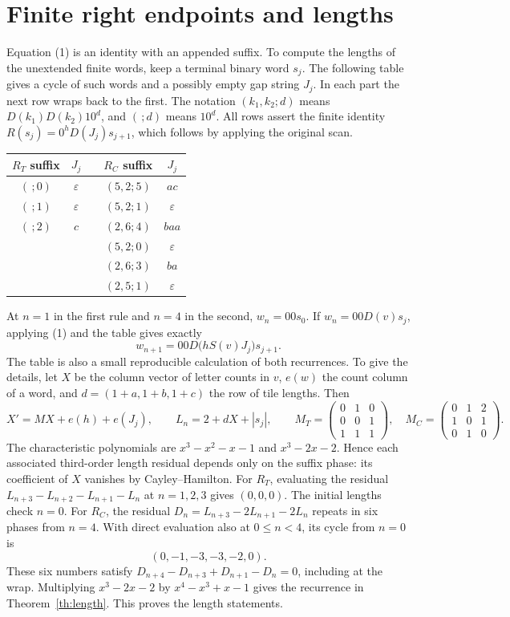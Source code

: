 \documentclass[10pt]{article}
\newcommand{\eps}{\varepsilon}
\begin{document}
\section{Finite right endpoints and lengths}
Equation (1) is an identity with an appended suffix. To compute the lengths of the
unextended finite words, keep a terminal binary word $s_j$. The following table gives a
cycle of such words and a possibly empty gap string $J_j$. In each part the next row
wraps back to the first. The notation $(k_1,k_2;d)$ means $D(k_1)D(k_2)10^d$,
and $(\,;d)$ means $10^d$. All rows assert the finite identity
$R(s_j)=0^h D(J_j)s_{j+1}$, which follows by applying the original scan.
\begin{center}
\begin{tabular}{ccccc}
\toprule
$R_T$ suffix & $J_j$ & \hspace{.35in} & $R_C$ suffix & $J_j$\\
\midrule
$(\,;0)$ & $\eps$ && $(5,2;5)$ & $ac$\\
$(\,;1)$ & $\eps$ && $(5,2;1)$ & $\eps$\\
$(\,;2)$ & $c$    && $(2,6;4)$ & $baa$\\
&&& $(5,2;0)$ & $\eps$\\
&&& $(2,6;3)$ & $ba$\\
&&& $(2,5;1)$ & $\eps$\\
\bottomrule
\end{tabular}
\end{center}
At $n=1$ in the first rule and $n=4$ in the second, $w_n=00s_0$.
If $w_n=00D(v)s_j$, applying (1) and the table gives exactly
\[
                        w_{n+1}=00D\big(hS(v)J_j\big)s_{j+1}.
\tag{3}
\]
The table is also a small reproducible calculation of both recurrences. To give the
details, let $X$ be the column vector of letter counts in $v$, $e(w)$ the count column
of a word, and $d=(1+a,1+b,1+c)$ the row of tile lengths. Then
\[
 X'=MX+e(h)+e(J_j),\qquad L_n=2+dX+|s_j|,\qquad
 M_T=\begin{pmatrix}0&1&0\\0&0&1\\1&1&1\end{pmatrix},\quad
 M_C=\begin{pmatrix}0&1&2\\1&0&1\\0&1&0\end{pmatrix}.
\]
The characteristic polynomials are $x^3-x^2-x-1$ and $x^3-2x-2$. Hence each associated
third-order length residual depends only on the suffix phase: its coefficient of $X$
vanishes by Cayley--Hamilton. For $R_T$, evaluating the residual
$L_{n+3}-L_{n+2}-L_{n+1}-L_n$ at $n=1,2,3$ gives $(0,0,0)$. The initial lengths check
$n=0$. For $R_C$, the residual $D_n=L_{n+3}-2L_{n+1}-2L_n$ repeats in six phases from
$n=4$. With direct evaluation also at $0\le n<4$, its cycle from $n=0$ is
\[
                          (0,-1,-3,-3,-2,0).
\]
These six numbers satisfy $D_{n+4}-D_{n+3}+D_{n+1}-D_n=0$, including at the wrap.
Multiplying $x^3-2x-2$ by $x^4-x^3+x-1$ gives the recurrence in
Theorem~\ref{th:length}. This proves the length statements.
\end{document}
